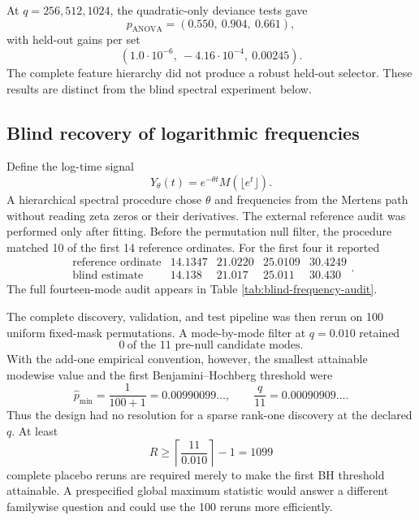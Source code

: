 \documentclass[11pt,reqno]{amsart}
\numberwithin{equation}{section}
\theoremstyle{plain}
\theoremstyle{definition}
\theoremstyle{remark}
\begin{document}
At \(q=256,512,1024\), the quadratic-only deviance tests gave
\begin{equation}
p_{\mathrm{ANOVA}}=(0.550,\ 0.904,\ 0.661),
\label{eq:local-anova-results}
\end{equation}
with held-out gains per set
\begin{equation}
(1.0\cdot10^{-6},\ -4.16\cdot10^{-4},\ 0.00245).
\label{eq:local-anova-test-gains}
\end{equation}
The complete feature hierarchy did not produce a robust held-out selector.
These results are distinct from the blind spectral experiment below.

\subsection{Blind recovery of logarithmic frequencies}
\label{subsec:blind-spectral-recovery}

Define the log-time signal
\begin{equation}
Y_{\theta}(t)=e^{-\theta t}M(\lfloor e^t\rfloor).
\label{eq:blind-log-signal}
\end{equation}
A hierarchical spectral procedure chose \(\theta\) and frequencies from the
Mertens path without reading zeta zeros or their derivatives.  The external
reference audit was performed only after fitting.  Before the permutation
null filter, the procedure matched 10 of the first 14 reference ordinates.
For the first four it reported
\begin{equation}
\begin{array}{c|rrrr}
\text{reference ordinate}&14.1347&21.0220&25.0109&30.4249\\ \hline
\text{blind estimate}&14.138&21.017&25.011&30.430
\end{array}.
\label{eq:first-four-blind-frequencies}
\end{equation}
The full fourteen-mode audit appears in Table
\ref{tab:blind-frequency-audit}.

The complete discovery, validation, and test pipeline was then rerun on 100
uniform fixed-mask permutations.  A mode-by-mode filter at
\(q=0.010\) retained
\begin{equation}
0\ \text{of the 11 pre-null candidate modes}.
\label{eq:blind-null-filter-result}
\end{equation}
With the add-one empirical convention, however, the smallest attainable
modewise value and the first Benjamini--Hochberg threshold were
\begin{equation}
\widehat p_{\min}=\frac1{100+1}=0.00990099\ldots,
\qquad
\frac{q}{11}=0.00090909\ldots.
\label{eq:blind-bh-resolution-obstruction}
\end{equation}
Thus the design had no resolution for a sparse rank-one discovery at the
declared \(q\).  At least
\begin{equation}
R\geq\left\lceil\frac{11}{0.010}\right\rceil-1=1099
\label{eq:minimum-placebos-for-bh}
\end{equation}
complete placebo reruns are required merely to make the first BH threshold
attainable.  A prespecified global maximum statistic would answer a different
familywise question and could use the 100 reruns more efficiently.
\end{document}
